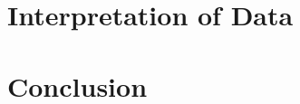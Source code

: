 \documentclass[letterpaper,twocolumn,amsmath,amssymb,pre]{revtex4-1}
\newcommand{\red}[1]{{\bf \color{red} #1}}
\newcommand{\fixme}[1]{\red{[#1]}}
\begin{document}






\section{Interpretation of Data}
\section{Conclusion}

\end{document}
